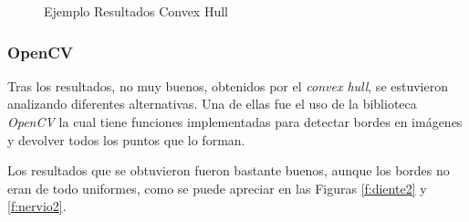 \begin{figure}[h]
 \centering
 \caption{Ejemplo Resultados Convex Hull}
 \label{f:convex-hull}
\end{figure}

\subsubsection{OpenCV}
Tras los resultados, no muy buenos, obtenidos por el \emph{convex hull}, se estuvieron analizando diferentes alternativas. Una de ellas fue el uso de la biblioteca \emph{OpenCV} la cual tiene funciones implementadas para detectar bordes en imágenes y devolver todos los puntos que lo forman.

Los resultados que se obtuvieron fueron bastante buenos, aunque los bordes no eran de todo uniformes, como se puede apreciar en las Figuras \ref{f:diente2} y \ref{f:nervio2}.

